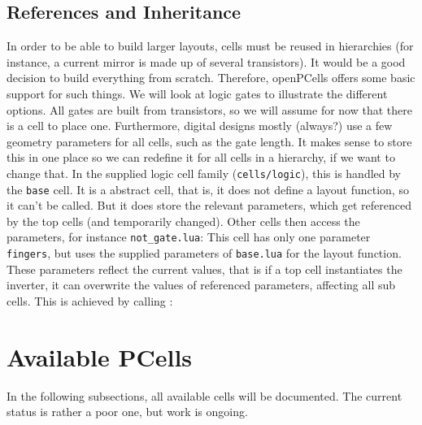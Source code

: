 \subsection{References and Inheritance}
In order to be able to build larger layouts, cells must be reused in hierarchies (for instance, a current mirror is made up of several transistors). It would be
a good decision to build everything from scratch. Therefore, openPCells offers some basic support for such things. We will look at logic gates to illustrate the
different options. All gates are built from transistors, so we will assume for now that there is a cell to place one. Furthermore, digital designs mostly
(always?) use a few geometry parameters for all cells, such as the gate length. It makes sense to store this in one place so we can redefine it for all cells in
a hierarchy, if we want to change that. In the supplied logic cell family (\texttt{cells/logic}), this is handled by the \texttt{base} cell. It is a abstract
cell, that is, it does not define a layout function, so it can't be called. But it does store the relevant parameters, which get referenced by the top cells (and
temporarily changed). Other cells then access the parameters, for instance \texttt{not\_gate.lua}:
This cell has only one parameter \texttt{fingers}, but uses the supplied parameters of \texttt{base.lua} for the layout function. These parameters reflect the
current values, that is if a top cell instantiates the inverter, it can overwrite the values of referenced parameters, affecting all sub cells. This is achieved
by calling :

\section{Available PCells}
In the following subsections, all available cells will be documented. The current status is rather a poor one, but work is ongoing.
